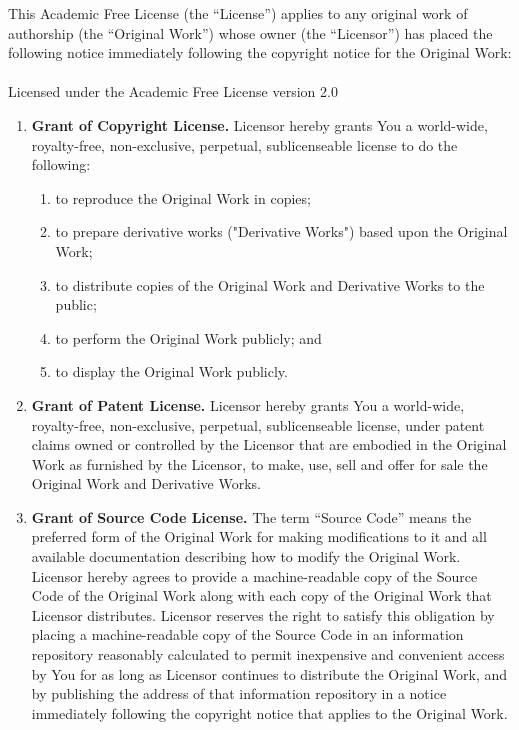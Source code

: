 \begin{it}
This Academic Free License (the ``License'') applies to any original work of authorship 
(the ``Original Work'') whose owner (the ``Licensor'') has placed the following 
notice immediately following the copyright notice for the Original Work:\\
\\
Licensed under the Academic Free License version 2.0

\begin{enumerate}
\item \textbf{Grant of Copyright License.} Licensor hereby grants You a world-wide, royalty-free, 
      non-exclusive, perpetual, sublicenseable license to do the following:
	  
   \begin{enumerate}
   \item to reproduce the Original Work in copies; 
   \item to prepare derivative works ("Derivative Works") based upon the Original Work; 
   \item to distribute copies of the Original Work and Derivative Works to the public; 
   \item to perform the Original Work publicly; and 
   \item to display the Original Work publicly. 
   \end{enumerate}

\item \textbf{Grant of Patent License.} Licensor hereby grants You a world-wide, royalty-free, non-exclusive, 
      perpetual, sublicenseable license, under patent claims owned or controlled by the Licensor that are embodied 
	  in the Original Work as furnished by the Licensor, to make, use, sell and offer for sale the 
	  Original Work and Derivative Works. 
   	   
\item \textbf{Grant of Source Code License.}  The term ``Source Code'' means the preferred form of the 
      Original Work for making modifications to it and all available documentation describing how to modify the 
	  Original Work. Licensor hereby agrees to provide a machine-readable copy of the Source Code of the 
	  Original Work along with each copy of the Original Work that Licensor distributes. 
	  Licensor reserves the right to satisfy this obligation by placing a machine-readable copy of 
	  the Source Code in an information repository reasonably calculated to permit inexpensive and convenient 
	  access by You for as long as Licensor continues to distribute the Original Work, and by publishing the 
	  address of that information repository in a notice immediately following the copyright 
	  notice that applies to the Original Work. 


\end{enumerate}
\end{it}
